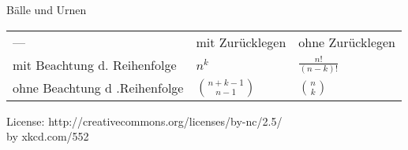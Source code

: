 \documentclass[18pt]{beamer}
\begin{document}
\begin{frame}{Bälle und Urnen}
 \begin{tabular}{lll}
  --- 				&	mit Zurücklegen 	& ohne Zurücklegen 	\\
 mit Beachtung d. Reihenfolge  	& 	$n^k$			& $\frac{n!}{(n-k)!}$	\\
 ohne Beachtung d .Reihenfolge 	& 	$\binom{n+k-1}{n-1}$	& $\binom{n}{k}$
 \end{tabular}

\end{frame}



\begin{frame}
License: http://creativecommons.org/licenses/by-nc/2.5/ \\
by xkcd.com/552
\end{frame}
\end{document}
